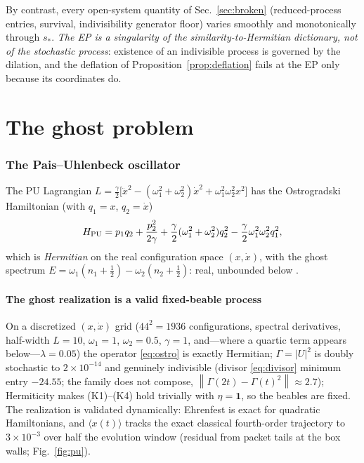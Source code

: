 \documentclass[11pt]{article}
\theoremstyle{definition}
\theoremstyle{remark}
\newcommand{\Gam}{\Gamma}
\newcommand{\norm}[1]{\left\lVert #1 \right\rVert}
\newcommand{\avg}[1]{\langle #1 \rangle}
\begin{document}
By contrast, every open-system quantity of Sec.~\ref{sec:broken}
(reduced-process entries, survival, indivisibility generator floor) varies
smoothly and monotonically through $s_*$. \emph{The EP is a singularity of
the similarity-to-Hermitian dictionary, not of the stochastic process}:
existence of an indivisible process is governed by the dilation, and the
deflation of Proposition~\ref{prop:deflation} fails at the EP only because
its coordinates do.

\part{The ghost problem}

\section{The Pais--Uhlenbeck oscillator}
\label{sec:pu}

The PU Lagrangian
$L=\tfrac{\gamma}{2}\bigl[\ddot x^{2}-(\omega_1^{2}+\omega_2^{2})\dot
x^{2}+\omega_1^{2}\omega_2^{2}x^{2}\bigr]$
has the Ostrogradski Hamiltonian (with $q_1=x$, $q_2=\dot x$)
\begin{equation}
H_{\rm PU}=p_1q_2+\frac{p_2^{2}}{2\gamma}
+\frac{\gamma}{2}(\omega_1^{2}+\omega_2^{2})q_2^{2}
-\frac{\gamma}{2}\omega_1^{2}\omega_2^{2}q_1^{2},
\label{eq:ostro}
\end{equation}
which is \emph{Hermitian} on the real configuration space $(x,\dot x)$,
with the ghost spectrum
$E=\omega_1(n_1+\tfrac12)-\omega_2(n_2+\tfrac12)$: real, unbounded below
\cite{PaisUhlenbeck1950,BenderMannheim2008}.

\subsection{The ghost realization is a valid fixed-beable process}

On a discretized $(x,\dot x)$ grid ($44^{2}=1936$ configurations, spectral
derivatives, half-width $L=10$, $\omega_1=1$, $\omega_2=0.5$, $\gamma=1$,
and---where a quartic term appears below---$\lambda=0.05$) the operator
\eqref{eq:ostro} is exactly Hermitian; $\Gam=|U|^{2}$ is doubly stochastic
to $2\times10^{-14}$ and genuinely indivisible (divisor \eqref{eq:divisor}
minimum entry $-24.55$; the family does not compose, $\norm{\Gam(2t)-\Gam(t)^{2}}\approx2.7$); Hermiticity makes (K1)--(K4)
hold trivially with $\eta=\mathbf 1$, so the beables are fixed. The
realization is validated dynamically: Ehrenfest is exact for quadratic
Hamiltonians, and $\avg{x(t)}$ tracks the exact classical fourth-order
trajectory to $3\times10^{-3}$ over half the evolution window (residual
from packet tails at the box walls; Fig.~\ref{fig:pu}).
\end{document}
